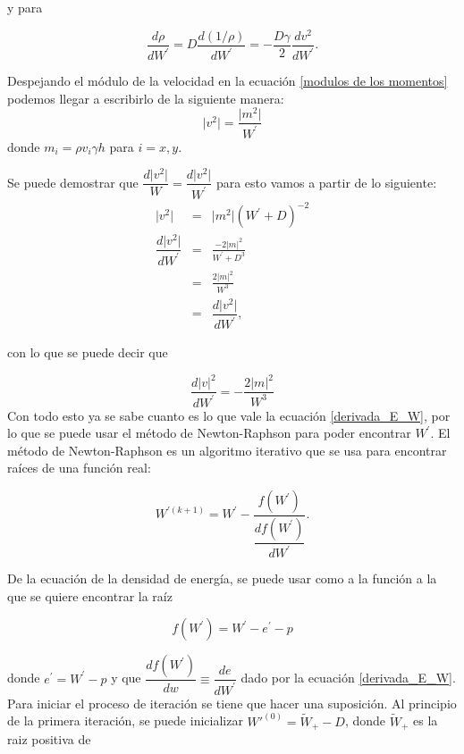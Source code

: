 \documentclass[12pt,a4paper]{book}
\providecommand{\abs}[1]{\lvert#1\rvert} %
\begin{document}
\noindent y para

\begin{equation}\label{der_rho}
\dfrac{d \rho}{d W^{'}}= D \dfrac{d\left(1/ \rho \right) }{d W^{'}} = - \frac{D \gamma}{2}  \dfrac{d v^2}{dW^{'}}.
\end{equation}

\noindent Despejando el módulo de la velocidad en la ecuación \ref{modulos de los momentos} podemos llegar a escribirlo de la siguiente manera:
\begin{equation}
\abs{v^{2}} = \frac{\abs{m^{2}}}{W^{'}} 
\end{equation}
\noindent donde $m_i= \rho v_i \gamma h$ para $i=x,y$.

Se puede demostrar que $\dfrac{d \abs{v^2}}{W}=\dfrac{d \abs{v^2}}{W^{'}}$ para esto vamos a partir de lo siguiente: 
\begin{eqnarray*}
\abs{v^2}&=& \abs{m^{2}} \left(W^{'} + D \right)^{-2} \\
\dfrac{d \abs{v^2}}{d W^{'}} &=& \frac{-2 \abs{m}^2}{W^{'}+D^{3}} \\
&=& \frac{2 \abs{m}^2}{W^{3}} \\
&=& \dfrac{d \abs{v^2}}{d W^{'}},
\end{eqnarray*}

\noindent con lo que se puede decir que 

\begin{equation}\label{der_v2}
\dfrac{d\abs{v}^2}{d W^{'} }=-\frac{2 \abs{m}^{2}}{W^{3}}
\end{equation}
Con todo esto ya se sabe cuanto es lo que vale la ecuación \ref{derivada_E_W}, por lo que se puede usar el método de Newton-Raphson para poder encontrar $W^{'}$.
El método de Newton-Raphson es un algoritmo iterativo que se usa para encontrar raíces  de una función real:

\begin{equation} \label{eq_Newton_Raphson}
W^{'(k+1)}=W^{'}-\frac{f(W^{'})}{\dfrac{d f(W^{'})}{d W^{'}}}.
\end{equation}

De la ecuación de la densidad de energía, se puede usar como a la función a la que se quiere encontrar la raíz

\begin{equation} \label{ecuación_f}
f(W^{'})=W^{'}-e^{'}-p
\end{equation}

\noindent donde $e^{'}=W^{'}-p$ y que $\dfrac{d f(W^{'})}{d w} \equiv \dfrac{de}{dW^{'}}$ dado por la ecuación \ref{derivada_E_W}. 
Para iniciar el proceso de iteración se tiene que hacer una suposición. Al principio de la primera iteración, se puede inicializar $W'^{(0)} = \tilde{W}_{+}-D $, donde $\tilde{W}_{+}$ es la raiz positiva de 
\end{document}
